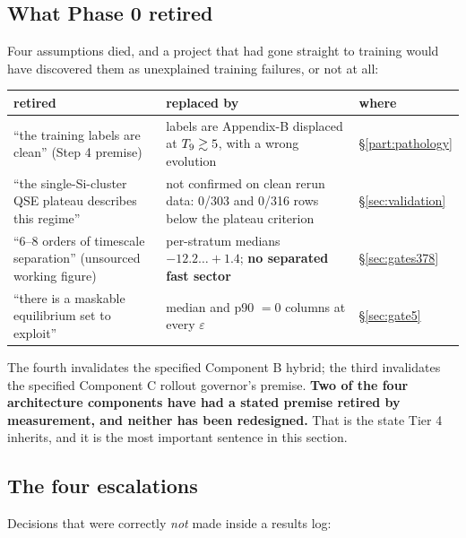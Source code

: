 \subsection{What Phase 0 retired}
\label{sec:retired}

Four assumptions died, and a project that had gone straight to training would
have discovered them as unexplained training failures, or not at all:

\begin{center}
\begin{tabularx}{\textwidth}{@{}L{5.4cm} Y L{1.6cm}@{}}
\toprule
\textbf{retired} & \textbf{replaced by} & \textbf{where} \\
\midrule
``the training labels are clean'' (Step 4 premise) &
  labels are Appendix-B displaced at $T_{9} \gtrsim 5$, with a wrong \Ye{}
  evolution & \S\ref{part:pathology} \\
``the single-Si-cluster QSE plateau describes this regime'' &
  not confirmed on clean rerun data: 0/303 and 0/316 rows below the plateau
  criterion & \S\ref{sec:validation} \\
``6--8 orders of timescale separation'' (unsourced working figure) &
  per-stratum medians $-12.2 \ldots +1.4$; \textbf{no separated fast sector} &
  \S\ref{sec:gates378} \\
``there is a maskable equilibrium set to exploit'' &
  median and p90 $= 0$ columns at every $\varepsilon$ & \S\ref{sec:gate5} \\
\bottomrule
\end{tabularx}
\end{center}

The fourth invalidates the specified Component B hybrid; the third invalidates
the specified Component C rollout governor's premise. \textbf{Two of the four
architecture components have had a stated premise retired by measurement, and
neither has been redesigned.} That is the state Tier 4 inherits, and it is the
most important sentence in this section.

\subsection{The four escalations}
\label{sec:escalations}

Decisions that were correctly \emph{not} made inside a results log:

